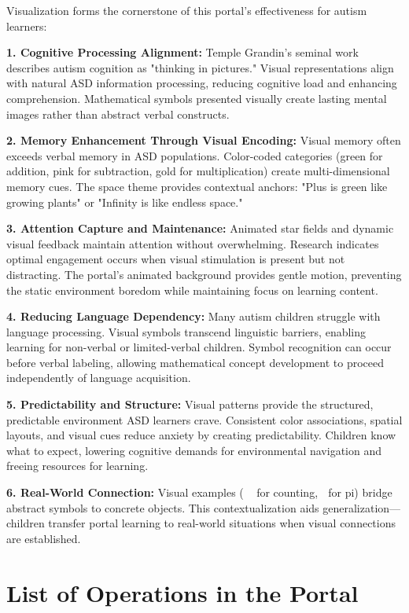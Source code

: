 \documentclass[11pt, a4paper]{article}
\begin{document}
Visualization forms the cornerstone of this portal's effectiveness for autism learners:

\textbf{1. Cognitive Processing Alignment:}
Temple Grandin's seminal work describes autism cognition as "thinking in pictures." Visual representations align with natural ASD information processing, reducing cognitive load and enhancing comprehension. Mathematical symbols presented visually create lasting mental images rather than abstract verbal constructs.

\textbf{2. Memory Enhancement Through Visual Encoding:}
Visual memory often exceeds verbal memory in ASD populations. Color-coded categories (green for addition, pink for subtraction, gold for multiplication) create multi-dimensional memory cues. The space theme provides contextual anchors: "Plus is green like growing plants" or "Infinity is like endless space."

\textbf{3. Attention Capture and Maintenance:}
Animated star fields and dynamic visual feedback maintain attention without overwhelming. Research indicates optimal engagement occurs when visual stimulation is present but not distracting. The portal's animated background provides gentle motion, preventing the static environment boredom while maintaining focus on learning content.

\textbf{4. Reducing Language Dependency:}
Many autism children struggle with language processing. Visual symbols transcend linguistic barriers, enabling learning for non-verbal or limited-verbal children. Symbol recognition can occur before verbal labeling, allowing mathematical concept development to proceed independently of language acquisition.

\textbf{5. Predictability and Structure:}
Visual patterns provide the structured, predictable environment ASD learners crave. Consistent color associations, spatial layouts, and visual cues reduce anxiety by creating predictability. Children know what to expect, lowering cognitive demands for environmental navigation and freeing resources for learning.

\textbf{6. Real-World Connection:}
Visual examples (🌟🌟🌟 for counting, 🍕 for pi) bridge abstract symbols to concrete objects. This contextualization aids generalization—children transfer portal learning to real-world situations when visual connections are established.

\newpage

\section{List of Operations in the Portal}
\end{document}
